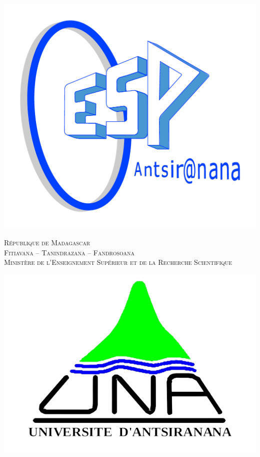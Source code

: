 \documentclass[a4paper,12pt]{article}
\begin{document}
\begin{titlepage}
    \centering
    
    \begin{minipage}{0.15\textwidth}
        \includegraphics[width=\linewidth]{images/couverture/logo-espa-1.png}
    \end{minipage}
    \hfill
    \begin{minipage}{0.6\textwidth}
        \centering
        \textsc{\large République de Madagascar} \\
        \textsc{Fitiavana – Tanindrazana – Fandrosoana} \\[0.2cm]
        \textsc{Ministère de l'Enseignement Supérieur et de la Recherche Scientifique}
    \end{minipage}
    \hfill
    \begin{minipage}{0.15\textwidth}
        \includegraphics[width=\linewidth]{images/couverture/logo-una.png}
    \end{minipage}
    

\end{titlepage}
\end{document}
